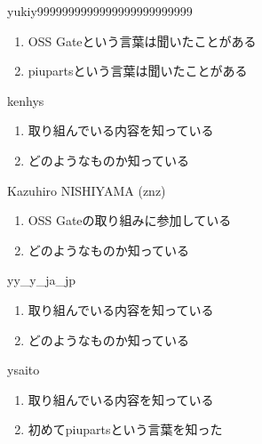 \begin{prework}{ yukiy9999999999999999999999999 }
  \begin{enumerate}
  \item OSS Gateという言葉は聞いたことがある
  \item piupartsという言葉は聞いたことがある
  \end{enumerate}
\end{prework}

\begin{prework}{ kenhys }
  \begin{enumerate}
  \item 取り組んでいる内容を知っている
  \item どのようなものか知っている
  \end{enumerate}
\end{prework}

\begin{prework}{ Kazuhiro NISHIYAMA (znz) }
  \begin{enumerate}
  \item OSS Gateの取り組みに参加している
  \item どのようなものか知っている
  \end{enumerate}
\end{prework}

\begin{prework}{ yy\_y\_ja\_jp }
  \begin{enumerate}
  \item 取り組んでいる内容を知っている
  \item どのようなものか知っている
  \end{enumerate}
\end{prework}

\begin{prework}{ ysaito }
  \begin{enumerate}
  \item 取り組んでいる内容を知っている
  \item 初めてpiupartsという言葉を知った
  \end{enumerate}
\end{prework}
